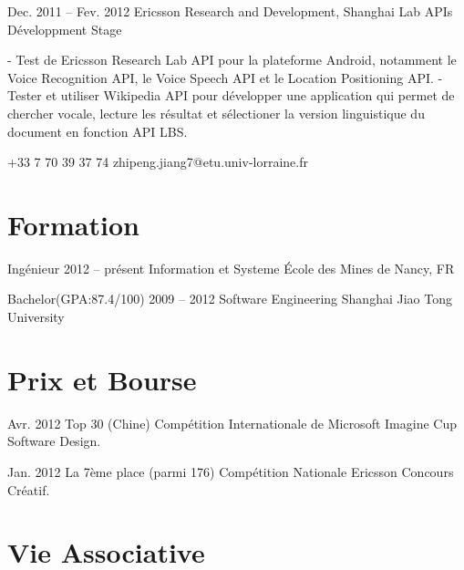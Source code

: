 \documentclass{tccv}
\begin{document}
\begin{eventlist}
\item{Dec. 2011 -- Fev. 2012}
     {Ericsson Research and Development, Shanghai}
     {Lab APIs Développment Stage}

- Test de Ericsson Research Lab API pour la plateforme Android, notamment le Voice Recognition API, le Voice Speech API et le Location Positioning API.
\newline
- Tester et utiliser Wikipedia API pour développer une application qui permet de chercher vocale, lecture les résultat et sélectioner la version linguistique du document en fonction API LBS.

\end{eventlist}

    {+33 7 70 39 37 74}
    {zhipeng.jiang7@etu.univ-lorraine.fr}

\section{Formation}

\begin{yearlist}

\item[Ingénieur]{2012 -- présent}
     {Information et Systeme}
     {École des Mines de Nancy, FR}

\item[Bachelor(GPA:87.4/100)]{2009 -- 2012}
     {Software Engineering}
     {Shanghai Jiao Tong University}

\end{yearlist}

\section{Prix et Bourse}

\begin{yearlist}

\item{Avr. 2012}
     {Top 30 (Chine)}
     {Compétition Internationale de Microsoft Imagine Cup Software Design.}
     
\item{Jan. 2012}
     {La 7ème place (parmi 176)}
     {Compétition Nationale Ericsson Concours Créatif.}

\end{yearlist}

\section{Vie Associative}
\end{document}
